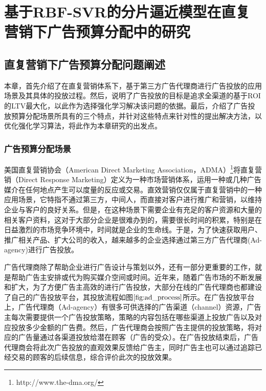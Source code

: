 \chapter{基于RBF-SVR的分片逼近模型在直复营销下广告预算分配中的研究}


\section{直复营销下广告预算分配问题阐述}
本章，首先介绍了在直复营销体系下，基于第三方广告代理商进行广告投放的应用场景及其具体的投放过程。然后，说明了广告投放的目标是追求全渠道的基于ROI的LTV最大化，以此作为选择强化学习解决该问题的依据。最后，介绍了广告投放预算分配场景所具有的三个特点，并针对这些特点来针对性的提出解决方法，以优化强化学习算法，将此作为本章研究的出发点。

\subsection{广告预算分配场景}
美国直复营销协会（American Direct Marketing Association，ADMA）\footnote{http://www.the-dma.org/}将直复营销（Direct Response Marketing）定义为一种市场营销体系，运用一种或几种广告媒介在任何地点产生可以度量的反应或交易。直效营销仅仅属于直复营销中的一种应用场景，它特指不通过第三方，中间人，而直接对客户进行推广和营销，以维持企业与客户的良好关系。但是，在这种场景下需要企业有充足的客户资源和大量的相关客户资料，这对于大部分企业是很难办到的，需要很长时间的积累，特别是在日益激烈的市场竞争环境中，时间就是企业的生命线。于是，为了快速获取用户、推广相关产品、扩大公司的收入，越来越多的企业选择通过第三方广告代理商(Ad-agency)进行广告投放。

广告代理商除了帮助企业进行广告设计与策划以外，还有一部分更重要的工作，就是帮助广告主安排或代为购买媒介空间或时间。近年来，随着广告市场的不断发展和扩大，为了方便广告主高效的进行广告投放，大部分在线的广告代理商也都建设了自己的广告投放平台，其投放流程如图$\ref{fig:ad_process}$所示。在广告投放平台上，广告代理商（Ad-agency）有很多可供选择的广告渠道（channel）资源，广告主每次需要提供一个广告投放策略，策略的内容包括在哪些渠道上投放广告以及对应投放多少金额的广告费。然后，广告代理商会按照广告主提供的投放策略，将对应的广告量通过各渠道投放给潜在顾客（广告的受众）。在广告投放结束后，广告代理商会将此次广告投放的直观效果反馈给广告主，同时广告主也可以通过追踪已经交易的顾客的后续信息，综合评价此次的投放效果。

